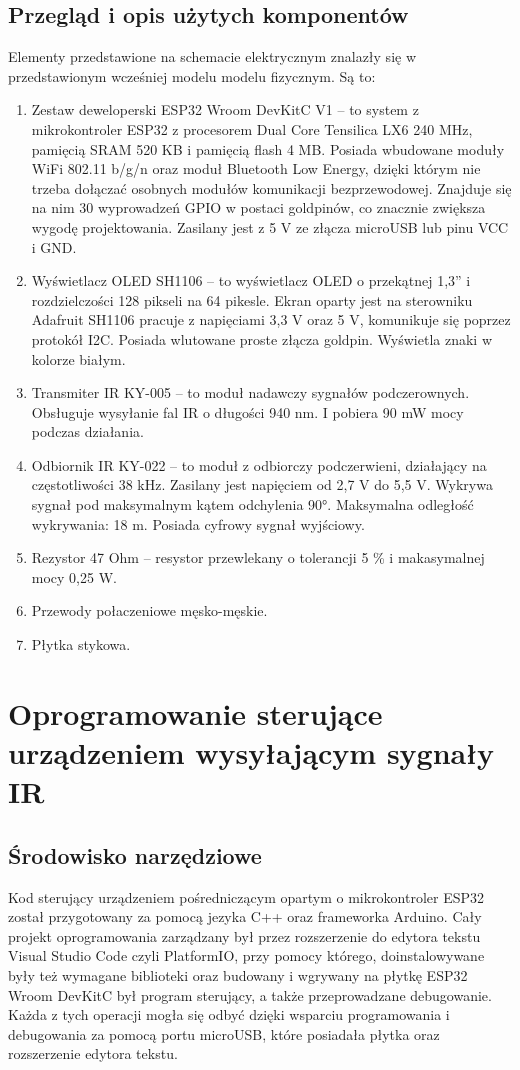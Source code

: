 \documentclass[12pt,twoside]{article}
\begin{document}
\subsection{Przegląd i opis użytych komponentów}
Elementy przedstawione na schemacie elektrycznym znalazły się w przedstawionym wcześniej modelu modelu fizycznym. Są to:
\begin{enumerate}[label=\alph*), leftmargin=1.25cm]
   \item Zestaw deweloperski ESP32 Wroom DevKitC V1\cite{doitDevKitV1} -- to system z mikrokontroler ESP32 z procesorem Dual Core Tensilica LX6 240 MHz, pamięcią SRAM 520 KB i pamięcią flash 4 MB. Posiada wbudowane moduły WiFi 802.11 b/g/n oraz moduł Bluetooth Low Energy, dzięki którym nie trzeba dołączać osobnych modułów komunikacji bezprzewodowej. Znajduje się na nim 30 wyprowadzeń GPIO w postaci goldpinów, co znacznie zwiększa wygodę projektowania. Zasilany jest z 5 V ze złącza microUSB lub pinu VCC i GND.
   \item Wyświetlacz OLED SH1106\cite{sh1106} -- to wyświetlacz OLED o przekątnej 1,3'' i rozdzielczości 128 pikseli na 64 pikesle. Ekran oparty jest na sterowniku Adafruit SH1106 pracuje z napięciami 3,3 V oraz 5 V, komunikuje się poprzez protokół I2C. Posiada wlutowane proste złącza goldpin. Wyświetla znaki w kolorze białym.
   \item Transmiter IR KY-005\cite{ky005} -- to moduł nadawczy sygnałów podczerownych. Obsługuje wysyłanie fal IR o długości 940 nm. I pobiera 90 mW mocy podczas działania.
   \item Odbiornik IR KY-022\cite{ky022}  -- to moduł z odbiorczy podczerwieni, działający na częstotliwości 38 kHz. Zasilany jest napięciem od 2,7 V do 5,5 V. Wykrywa sygnał pod maksymalnym kątem odchylenia 90°. Maksymalna odległość wykrywania: 18 m. Posiada cyfrowy sygnał wyjściowy.
   \item Rezystor 47 Ohm -- resystor przewlekany o tolerancji 5 \% i makasymalnej mocy 0,25 W.
   \item Przewody połaczeniowe męsko-męskie.
   \item Płytka stykowa.
\end{enumerate}

\clearpage

\section{Oprogramowanie sterujące urządzeniem wysyłającym sygnały IR}
\subsection{Środowisko narzędziowe}
Kod sterujący urządzeniem pośredniczącym opartym o mikrokontroler ESP32 został przygotowany za pomocą jezyka C++ oraz frameworka Arduino. Cały projekt oprogramowania zarządzany był przez rozszerzenie do edytora tekstu Visual Studio Code czyli PlatformIO, przy pomocy którego, doinstalowywane były też wymagane biblioteki oraz budowany i wgrywany na płytkę ESP32 Wroom DevKitC był program sterujący, a także przeprowadzane debugowanie. Każda z tych operacji mogła się odbyć dzięki wsparciu programowania i debugowania za pomocą portu microUSB, które posiadała płytka oraz rozszerzenie edytora tekstu.
\end{document}
